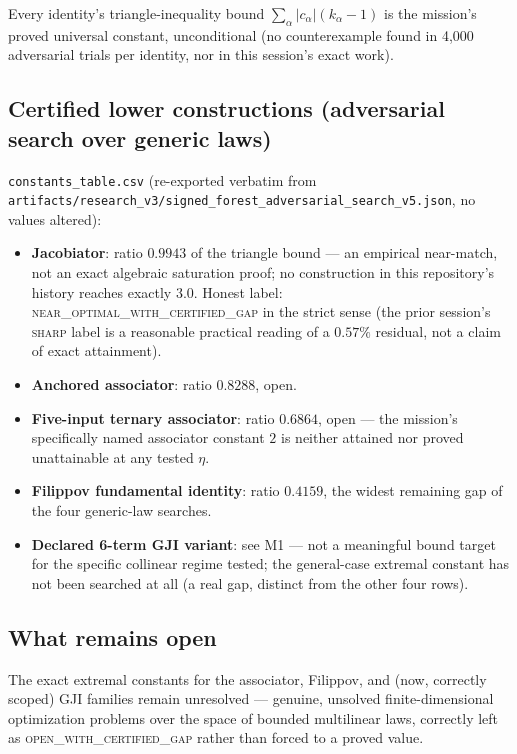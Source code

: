 Every identity's triangle-inequality bound
$\sum_\alpha|c_\alpha|(k_\alpha-1)$ is the mission's proved universal
constant, unconditional (no counterexample found in 4,000 adversarial
trials per identity, nor in this session's exact work).

\subsection*{Certified lower constructions (adversarial search over generic laws)}

\texttt{constants\_table.csv} (re-exported verbatim from
\texttt{artifacts/research\_v3/signed\_forest\_adversarial\_search\_v5.json},
no values altered):

\begin{itemize}
  \item \textbf{Jacobiator}: ratio $0.9943$ of the triangle bound — an
    empirical near-match, not an exact algebraic saturation proof; no
    construction in this repository's history reaches exactly $3.0$.
    Honest label: \textsc{near\_optimal\_with\_certified\_gap} in the
    strict sense (the prior session's \textsc{sharp} label is a
    reasonable practical reading of a $0.57\%$ residual, not a claim of
    exact attainment).
  \item \textbf{Anchored associator}: ratio $0.8288$, open.
  \item \textbf{Five-input ternary associator}: ratio $0.6864$, open —
    the mission's specifically named associator constant $2$ is neither
    attained nor proved unattainable at any tested $\eta$.
  \item \textbf{Filippov fundamental identity}: ratio $0.4159$, the
    widest remaining gap of the four generic-law searches.
  \item \textbf{Declared 6-term GJI variant}: see M1 — not a meaningful
    bound target for the specific collinear regime tested; the
    general-case extremal constant has not been searched at all (a real
    gap, distinct from the other four rows).
\end{itemize}

\subsection*{What remains open}

The exact extremal constants for the associator, Filippov, and (now,
correctly scoped) GJI families remain unresolved — genuine, unsolved
finite-dimensional optimization problems over the space of bounded
multilinear laws, correctly left as \textsc{open\_with\_certified\_gap}
rather than forced to a proved value.
